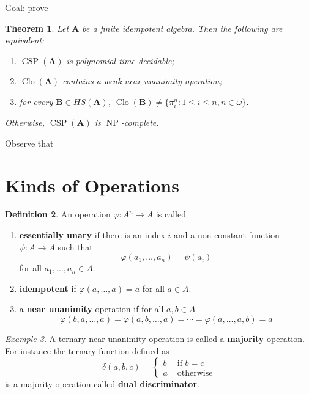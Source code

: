 \documentclass{amsart}
\theoremstyle{plain}
\newtheorem{theorem}{Theorem}[section]
\theoremstyle{definition}
\newtheorem{definition}[theorem]{Definition}
\theoremstyle{remark}
\newtheorem{example}[theorem]{Example}
\def\phi{\varphi}
\DeclareMathOperator{\Clo}{Clo}
\DeclareMathOperator{\CSP}{CSP}
\DeclareMathOperator{\NP}{NP}
\begin{document}
Goal: prove 

\begin{theorem}
    Let $\mathbf{A}$ be a finite 
    idempotent 
    algebra. 
    Then the following are equivalent: 
    \begin{enumerate}
        \item $\CSP(\mathbf{A})$ is polynomial-time decidable; 
        \item $\Clo(\mathbf{A})$ contains a weak near-unanimity operation; 
        \item for every $\mathbf{B} \in HS(\mathbf{A})$, $\Clo(\mathbf{B}) \neq \{\pi^n_i: 1 \le i \le n, n \in \omega\}$. 
    \end{enumerate}
    Otherwise, $\CSP(\mathbf{A})$ is $\NP$-complete. 
\end{theorem}

Observe that 

\section{Kinds of Operations}

\begin{definition}
    An operation $\phi: A^n \to A$ is called 
    \begin{enumerate}
        \item \textbf{essentially unary} if there is an index $i$ and a non-constant function $\psi: A \to A$ such that 
        \begin{equation*}
        \phi(a_1, \ldots, a_n) = \psi(a_i)
        \end{equation*}
        for all $a_1, \ldots, a_n \in A$. 
        \item \textbf{idempotent} if $\phi(a, \ldots, a)=a$ for all $a \in A$. 
        \item a \textbf{near unanimity} operation if for all $a,b \in A$ 
        \begin{equation*}
            \phi(b, a, \ldots, a) = \phi(a, b, \ldots, a) = \cdots = \phi(a, \ldots, a, b)= a 
        \end{equation*}
    \end{enumerate}
\end{definition}

\begin{example}
    \label{dual}
    A ternary near unanimity operation is called a \textbf{majority} operation. 
    For instance the ternary function defined as 
    \begin{equation*}
        \delta(a,b,c) = 
        \begin{cases}
            b & \text{ if } b = c \\
            a & \text{ otherwise}
        \end{cases}
    \end{equation*}
    is a majority operation called \textbf{dual discriminator}. 
\end{example}
\end{document}
